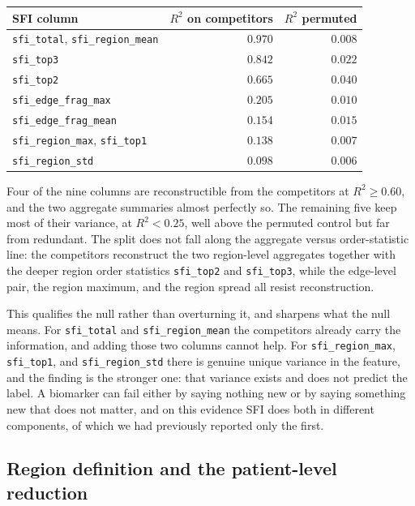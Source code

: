 \documentclass[11pt]{article}
\theoremstyle{definition}
\newcommand{\code}[1]{\texttt{#1}}
\begin{document}
\begin{center}
\small
\begin{tabular}{@{}lrr@{}}
\toprule
SFI column & $R^2$ on competitors & $R^2$ permuted \\
\midrule
\code{sfi\_total}, \code{sfi\_region\_mean} & $0.970$ & $0.008$ \\
\code{sfi\_top3}                            & $0.842$ & $0.022$ \\
\code{sfi\_top2}                            & $0.665$ & $0.040$ \\
\code{sfi\_edge\_frag\_max}                 & $0.205$ & $0.010$ \\
\code{sfi\_edge\_frag\_mean}                & $0.154$ & $0.015$ \\
\code{sfi\_region\_max}, \code{sfi\_top1}   & $0.138$ & $0.007$ \\
\code{sfi\_region\_std}                     & $0.098$ & $0.006$ \\
\bottomrule
\end{tabular}
\end{center}

Four of the nine columns are reconstructible from the competitors at
$R^2\geq0.60$, and the two aggregate summaries almost perfectly so. The remaining
five keep most of their variance, at $R^2<0.25$, well above the permuted control
but far from redundant. The split does not fall along the aggregate versus
order-statistic line: the competitors reconstruct the two region-level aggregates
together with the deeper region order statistics \code{sfi\_top2} and
\code{sfi\_top3}, while the edge-level pair, the region maximum, and the region
spread all resist reconstruction.

This qualifies the null rather than overturning it, and sharpens what the null
means. For \code{sfi\_total} and \code{sfi\_region\_mean} the competitors already
carry the information, and adding those two columns cannot help. For \code{sfi\_region\_max},
\code{sfi\_top1}, and \code{sfi\_region\_std} there is genuine unique variance in
the feature, and the finding is the stronger one: that variance exists and does
not predict the label. A biomarker can fail either by saying nothing new or by
saying something new that does not matter, and on this evidence SFI does both in
different components, of which we had previously reported only the first.


\subsection{Region definition and the patient-level reduction}
\label{sec:regions}
\end{document}
